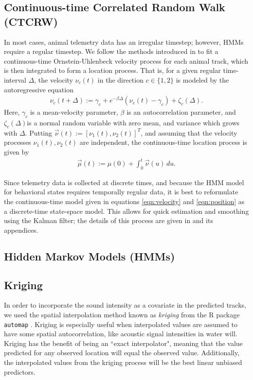 \documentclass[12pt]{article}
\begin{document}
	
	\subsection{Continuous-time Correlated Random Walk (CTCRW)}
	
	In most cases, animal telemetry data has an irregular timestep; however, HMMs require a regular timestep. We follow the methods introduced in \cite{Johnson2008} to fit a continuous-time Ornstein-Uhlenbeck velocity process for each animal track, which is then integrated to form a location process. That is, for a given regular time-interval $\Delta$, the velocity $\nu_c(t)$ in the direction $c \in \{1, 2\}$ is modeled by the autoregressive equation
	\begin{align}
		\nu_c(t + \Delta) := \gamma_c + e^{-\beta \Delta} (\nu_c(t) - \gamma_c) + \zeta_c(\Delta). \label{eqn:velocity}
	\end{align}
	Here, $\gamma_c$ is a mean-velocity parameter, $\beta$ is an autocorrelation parameter, and $\zeta_c(\Delta)$is a normal random variable with zero mean, and variance which grows with $\Delta$. Putting $\vec \nu(t) := [\nu_1(t), \nu_2(t)]^T$, and assuming that the velocity processes $\nu_1(t), \nu_2(t)$ are independent, the continuous-time location process is given by
	\begin{align}
		\vec \mu(t) := \mu(0) + \int_0^t \vec \nu(u) \, du. \label{eqn:position}
	\end{align}
	
	Since telemetry data is collected at discrete times, and because the HMM model for behavioral states requires temporally regular data, it is best to reformulate the continuous-time model given in equations \eqref{eqn:velocity} and \eqref{eqn:position} as a discrete-time state-space model. This allows for quick estimation and smoothing using the Kalman filter; the details of this process are given in \cite{Johnson2008} and its appendices.
	
	\subsection{Hidden Markov Models (HMMs)}
	

	
	\subsection{Kriging}
	
	In order to incorporate the sound intensity as a covariate in the predicted tracks, we used the spatial interpolation method known as \emph{kriging} from the R package \texttt{automap} \cite{Hiemstra2008}. Kriging is especially useful when interpolated values are assumed to have some spatial autocorrelation, like acoustic signal intensities in water will. Kriging has the benefit of being an ``exact interpolator", meaning that the value predicted for any observed location will equal the observed value. Additionally, the interpolated values from the kriging process will be the best linear unbiased predictors.
	
\end{document}
